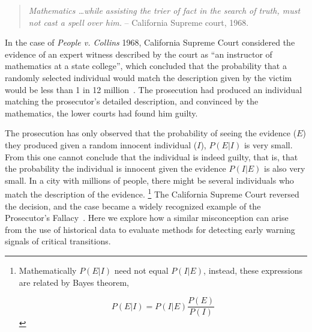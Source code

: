 \documentclass[authoryear,5p]{elsarticle}
\begin{document}
\begin{quotation}
\noindent \emph{Mathematics \dots while assisting the trier of fact in the search of truth, must not cast a spell over him.}
-- California Supreme court, 1968.
\end{quotation}

\noindent In the case of \emph{People v. Collins} 1968, California Supreme
Court considered the evidence of an expert witness described by the
court as ``an instructor of mathematics at a state college'', which
concluded that the probability that a randomly selected individual
would match the description given by the victim would be less than 1 in
12 million~\citep{PeopleCollins1968}.  The prosecution had produced an
individual matching the prosecutor's detailed description, and convinced
by the mathematics, the lower courts had found him
guilty.


The prosecution has only observed that the probability of seeing the
evidence ($E$) they produced given a random innocent individual ($I$),
$P(E|I)$ is very small.  From this one cannot conclude that the individual is indeed guilty, that is, that the
probability the individual is innocent given the evidence $P(I|E)$
is also very small. In a city with millions of people, there might
be several individuals who match the description of the evidence.
\footnote{Mathematically $P(E|I)$ need not equal $P(I|E)$, instead,
these expressions are related by Bayes theorem,

\begin{equation}
  P(E|I) = P(I|E) \frac{P(E)}{P(I)}
\end{equation} 

} The California
Supreme Court reversed the decision, and the case became a widely
recognized example of the Prosecutor's Fallacy~\citep{Thompson1987}.
Here we explore how a similar misconception can arise from the
use of historical data to evaluate methods for detecting early warning
signals of critical transitions.



\end{document}

